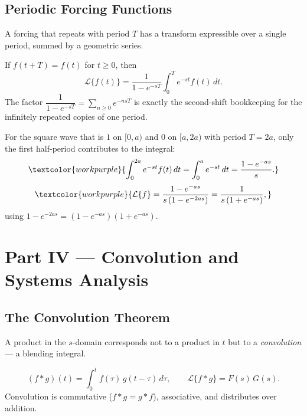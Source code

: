 \subsection{Periodic Forcing Functions}

A forcing that repeats with period $T$ has a transform expressible over a single
period, summed by a geometric series.

\begin{formulabox}
If $f(t+T)=f(t)$ for $t\ge 0$, then
\[ \mathcal{L}\{f(t)\} = \frac{1}{1 - e^{-sT}} \int_{0}^{T} e^{-st} f(t)\,dt. \]
The factor $\dfrac{1}{1-e^{-sT}} = \sum_{n\ge 0} e^{-nsT}$ is exactly the
second-shift bookkeeping for the infinitely repeated copies of one period.
\end{formulabox}

\begin{examplebox}
For the square wave that is $1$ on $[0,a)$ and $0$ on $[a,2a)$ with period $T=2a$,
only the first half-period contributes to the integral:
\[ \textcolor{workpurple}{\int_0^{2a} e^{-st}f(t)\,dt = \int_0^{a} e^{-st}\,dt
   = \frac{1-e^{-as}}{s}.} \]
\[ \textcolor{workpurple}{\mathcal{L}\{f\} = \frac{1-e^{-as}}{s\,(1-e^{-2as})}
   = \frac{1}{s\,(1+e^{-as})},} \]
using $1-e^{-2as}=(1-e^{-as})(1+e^{-as})$.
\end{examplebox}

\clearpage
{}
{}
\section*{Part IV --- Convolution and Systems Analysis}

\subsection{The Convolution Theorem}

A product in the $s$-domain corresponds not to a product in $t$ but to a
\emph{convolution} --- a blending integral.

\begin{formulabox}
\[ (f * g)(t) = \int_0^t f(\tau)\,g(t-\tau)\,d\tau, \qquad
   \mathcal{L}\{f*g\} = F(s)\,G(s). \]
Convolution is commutative ($f*g=g*f$), associative, and distributes over addition.
\end{formulabox}

